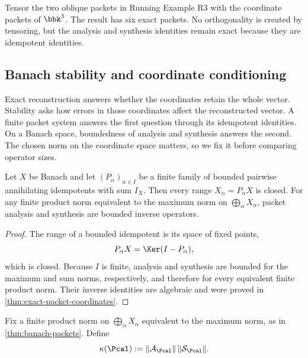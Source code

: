 \begin{microexample}[title={Tensoring the oblique packet split}]
Tensor the two oblique packets in Running Example R3 with the coordinate packets of \(\bbk^3\).  The result has six exact packets.  No orthogonality is created by tensoring, but the analysis and synthesis identities remain exact because they are idempotent identities.
\end{microexample}

\subsection{Banach stability and coordinate conditioning}
Exact reconstruction answers whether the coordinates retain the whole vector.  Stability asks how errors in those coordinates affect the reconstructed vector.  A finite packet system answers the first question through its idempotent identities.  On a Banach space, boundedness of analysis and synthesis answers the second.  The chosen norm on the coordinate space matters, so we fix it before comparing operator sizes.

\begin{theorem}
\label{thm:banach-packets}
Let $X$ be Banach and let $(P_\alpha)_{\alpha\in I}$ be a finite family of bounded pairwise annihilating idempotents with sum $I_X$.  Then every range $X_\alpha=P_\alpha X$ is closed.  For any finite product norm equivalent to the maximum norm on $\bigoplus_\alpha X_\alpha$, packet analysis and synthesis are bounded inverse operators.
\end{theorem}

\begin{proof}
The range of a bounded idempotent is its space of fixed points,
\[
P_\alpha X=\Ker(I-P_\alpha),
\]
which is closed.  Because $I$ is finite, analysis and synthesis are bounded for the maximum and sum norms, respectively, and therefore for every equivalent finite product norm.  Their inverse identities are algebraic and were proved in \cref{thm:exact-packet-coordinates}.
\end{proof}

\begin{definition}
\label{def:packet-condition-number}
Fix a finite product norm on $\bigoplus_\alpha X_\alpha$ equivalent to the maximum norm, as in \cref{thm:banach-packets}. Define
\[
\kappa(\Pcal):=
\|\mathcal A_{\Pcal}\|\,
\|\mathcal S_{\Pcal}\|.
\]
\end{definition}

